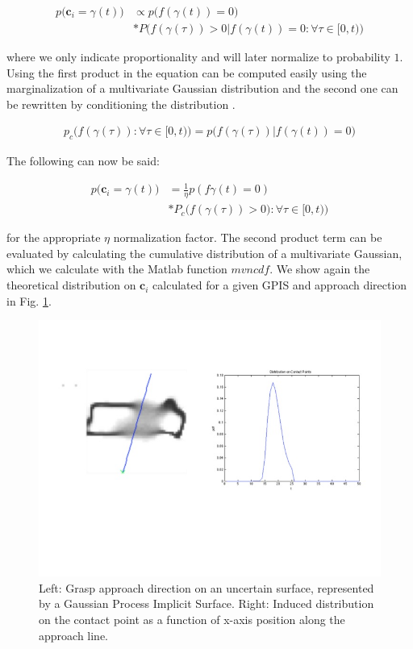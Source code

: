 \documentclass[letterpaper, 10 pt, conference]{ieeeconf}  %
\begin{document}
\begin{align*}
p\big(\textbf{c}_i = \gamma(t)\big) &\propto p\big(f(\gamma(t)) = 0\big)\\
               &*P\big(f(\gamma(\tau)) > 0 | f(\gamma(t)) = 0: \forall \tau \in [0,t)\big)
\end{align*}

where we only indicate proportionality and will later normalize to probability $1$.
Using the first product in the equation can be computed easily using the marginalization of a multivariate Gaussian distribution and the second one can be rewritten by conditioning the distribution \cite{petersen2008matrix}. 

\begin{align*}
p_c\big(f(\gamma(\tau)): \forall \tau \in [0,t)\big) = p\big(f(\gamma(\tau))  | f(\gamma(t)) = 0\big)  
\end{align*}


The following can now be said:

\begin{align*}
p\big(\textbf{c}_i = \gamma(t)\big) &= \frac{1}{\eta} p(f\gamma(t) = 0) \\
				   &*P_c\big(f(\gamma(\tau)) > 0): \forall \tau \in [0,t)\big)			 
\end{align*} 

for the appropriate $\eta$ normalization factor.
The second product term can be evaluated by calculating the cumulative distribution of a multivariate Gaussian, which we calculate with the Matlab function $mvncdf$.
We show again the theoretical distribution on $\textbf{c}_i$ calculated for a given GPIS and approach direction in Fig.
\ref{fig:GraspContactPt}.

\begin{figure}[ht!]
\centering
\includegraphics[scale = 0.3]{figures/Slide4.jpg}
\caption{Left: Grasp approach direction on an uncertain surface, represented by a Gaussian Process Implicit Surface.  Right: Induced distribution on the contact point as a function of x-axis position along the approach line.}
\vspace*{-10pt}
\label{fig:GraspContactPt}
\end{figure}
\end{document}
